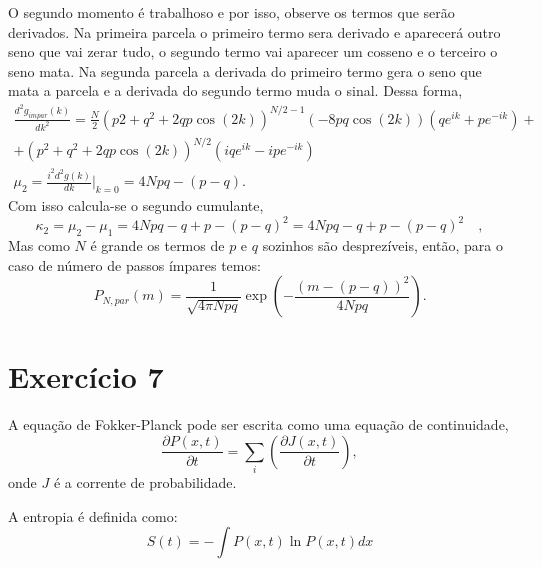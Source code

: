 \documentclass[12pt]{article}
\begin{document}
O segundo momento é trabalhoso e por isso, observe os termos que serão derivados. Na primeira parcela o primeiro termo sera derivado e aparecerá outro seno que vai zerar tudo, o segundo termo vai aparecer um cosseno e o terceiro o seno mata. Na segunda parcela a derivada do primeiro termo gera o seno que mata a parcela e a derivada do segundo termo muda o sinal. Dessa forma,
\begin{equation}
\begin{split}
\frac{d^2g_{impar}(k)}{dk^2} = \frac{N}{2}\left(p2 + q^2 + 2qp\cos(2k)\right)^{N/2 - 1}\left(-8pq\cos(2k)\right)(qe^{ik} + pe^{-ik}) + \\
+ (p^2 + q^2 + 2qp\cos(2k))^{N/2}(iqe^{ik}-ipe^{-ik})
\\
\mu_2 = \frac{i^2d^2g(k)}{dk}\Big\rvert_{k=0} = 4Npq - (p -q). 
\end{split}
\end{equation}
Com isso calcula-se o segundo cumulante,
\begin{equation}
\kappa_2 = \mu_2 - \mu_1 = 4Npq - q + p - (p - q)^2 = 4Npq - q + p -(p - q)^2 \quad, 
\end{equation}
Mas como $N$ é grande os termos de $p$ e $q$ sozinhos são desprezíveis, então, para o caso de número de passos ímpares temos:
\begin{equation}
P_{N, par}(m) = \frac{1}{\sqrt{4\pi Npq}}\exp{\left(-\frac{(m-(p-q))^2}{4Npq}\right)}.
\end{equation}  

\section*{Exercício 7}
A equação de Fokker-Planck pode ser escrita como uma equação de continuidade,
\begin{equation}
\frac{\partial P(x,t)}{\partial t} = \sum_i\left( \frac{\partial J(x, t)}{\partial t}\right),
\end{equation}
onde $J$ é a corrente de probabilidade. 

A entropia é definida como:
\begin{equation}
S(t) = -\int P(x,t) \ln P(x,t) dx
\end{equation}
\end{document}

